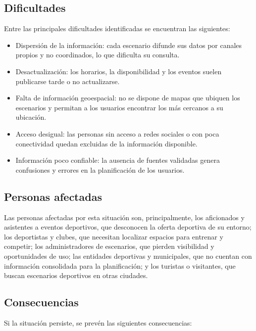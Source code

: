 \subsection{Dificultades}

Entre las principales dificultades identificadas se encuentran las siguientes:

\begin{itemize}
  \item Dispersi\'on de la informaci\'on: cada escenario difunde sus datos
    por canales propios y no coordinados, lo que dificulta su consulta.
  \item Desactualizaci\'on: los horarios, la disponibilidad y los eventos
    suelen publicarse tarde o no actualizarse.
  \item Falta de informaci\'on geoespacial: no se dispone de mapas que
    ubiquen los escenarios y permitan a los usuarios encontrar los m\'as
    cercanos a su ubicaci\'on.
  \item Acceso desigual: las personas sin acceso a redes sociales o con
    poca conectividad quedan excluidas de la informaci\'on disponible.
  \item Informaci\'on poco confiable: la ausencia de fuentes validadas
    genera confusiones y errores en la planificaci\'on de los usuarios.
\end{itemize}

\subsection{Personas afectadas}

Las personas afectadas por esta situaci\'on son, principalmente, los
aficionados y asistentes a eventos deportivos, que desconocen la oferta
deportiva de su entorno; los deportistas y clubes, que necesitan localizar
espacios para entrenar y competir; los administradores de escenarios, que
pierden visibilidad y oportunidades de uso; las entidades deportivas y
municipales, que no cuentan con informaci\'on consolidada para la planificaci\'on;
y los turistas o visitantes, que buscan escenarios deportivos en otras
ciudades.

\subsection{Consecuencias}

Si la situaci\'on persiste, se prev\'en las siguientes consecuencias:

